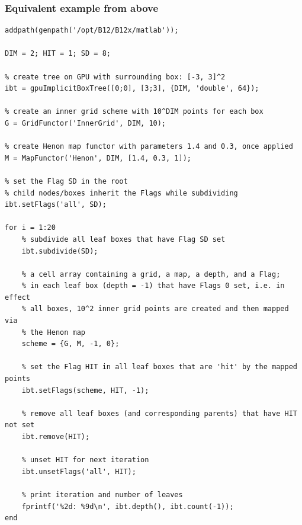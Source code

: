 \documentclass[a4paper,10pt,fleqn]{article}
\begin{document}
\subsubsection*{Equivalent example from above}

\begin{verbatim}
addpath(genpath('/opt/B12/B12x/matlab'));

DIM = 2; HIT = 1; SD = 8;

% create tree on GPU with surrounding box: [-3, 3]^2
ibt = gpuImplicitBoxTree([0;0], [3;3], {DIM, 'double', 64});

% create an inner grid scheme with 10^DIM points for each box
G = GridFunctor('InnerGrid', DIM, 10);

% create Henon map functor with parameters 1.4 and 0.3, once applied
M = MapFunctor('Henon', DIM, [1.4, 0.3, 1]);

% set the Flag SD in the root
% child nodes/boxes inherit the Flags while subdividing
ibt.setFlags('all', SD);

for i = 1:20
    % subdivide all leaf boxes that have Flag SD set
    ibt.subdivide(SD);
    
    % a cell array containing a grid, a map, a depth, and a Flag;
    % in each leaf box (depth = -1) that have Flags 0 set, i.e. in effect
    % all boxes, 10^2 inner grid points are created and then mapped via
    % the Henon map
    scheme = {G, M, -1, 0};
    
    % set the Flag HIT in all leaf boxes that are 'hit' by the mapped points
    ibt.setFlags(scheme, HIT, -1);
    
    % remove all leaf boxes (and corresponding parents) that have HIT not set
    ibt.remove(HIT);
    
    % unset HIT for next iteration
    ibt.unsetFlags('all', HIT);
    
    % print iteration and number of leaves
    fprintf('%2d: %9d\n', ibt.depth(), ibt.count(-1));
end
\end{verbatim}







\end{document}

